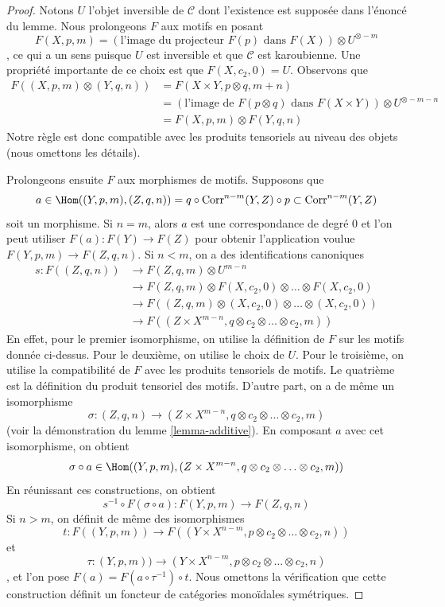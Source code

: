 \begin{proof}
Notons $U$ l'objet inversible de $\mathcal{C}$ dont l'existence
est supposée dans l'énoncé du lemme. Nous prolongeons $F$ aux motifs en posant
$$
F(X, p, m) = \left(\text{l'image du
projecteur }F(p)\text{ dans }F(X)\right) \otimes U^{\otimes -m}
$$,
ce qui a un sens puisque $U$ est inversible et que $\mathcal{C}$
est karoubienne. Une propriété importante de ce choix est que
$F(X, c_2, 0) = U$. Observons que
\begin{align*}
F((X, p, m) \otimes (Y, q, n))
& =
F(X \times Y, p \otimes q, m + n) \\
& =
\left(\text{l'image de }F(p \otimes q)\text{ dans }F(X \times Y)\right)
\otimes U^{\otimes -m - n} \\
& =
F(X, p, m) \otimes F(Y, q, n)
\end{align*}
Notre règle est donc compatible avec les produits tensoriels
au niveau des objets (nous omettons les détails).

\medskip\noindent
Prolongeons ensuite $F$ aux morphismes de motifs. Supposons que
$$
a \in
\Hom((Y, p, m), (Z, q, n)) =
q \circ \text{Corr}^{n - m}(Y, Z) \circ p \subset \text{Corr}^{n - m}(Y, Z)
$$
soit un morphisme. Si $n = m$, alors $a$ est une correspondance de degré $0$
et l'on peut utiliser $F(a) : F(Y) \to F(Z)$ pour obtenir l'application voulue
$F(Y, p, m) \to F(Z, q, n)$. Si $n < m$, on a des identifications canoniques
\begin{align*}
s : F((Z, q, n))
& \to
F(Z, q, m) \otimes U^{m - n} \\
& \to
F(Z, q, m) \otimes F(X, c_2, 0) \otimes \ldots \otimes F(X, c_2, 0) \\
& \to
F((Z, q, m) \otimes (X, c_2, 0) \otimes \ldots \otimes (X, c_2, 0)) \\
& \to
F((Z \times X^{m - n}, q \otimes c_2 \otimes \ldots \otimes c_2, m))
\end{align*}
En effet, pour le premier isomorphisme, on utilise la définition de $F$ sur les motifs
donnée ci-dessus. Pour le deuxième, on utilise le choix de $U$. Pour le troisième,
on utilise la compatibilité de $F$ avec les produits tensoriels de motifs.
Le quatrième est la définition du produit tensoriel des motifs. D'autre part,
on a de même un isomorphisme
$$
\sigma : (Z, q, n) \to
(Z \times X^{m - n}, q \otimes c_2 \otimes \ldots \otimes c_2, m)
$$
(voir la démonstration du lemme \ref{lemma-additive}). En composant $a$ avec cet isomorphisme,
on obtient
$$
\sigma \circ a \in
\Hom((Y, p, m),
(Z \times X^{m - n}, q \otimes c_2 \otimes \ldots \otimes c_2, m))
$$
En réunissant ces constructions, on obtient
$$
s^{-1} \circ F(\sigma \circ a) :
F(Y, p, m) \to
F(Z, q, n)
$$
Si $n > m$, on définit de même des isomorphismes
$$
t : F((Y, p, m)) \to
F((Y \times X^{n - m}, p \otimes c_2 \otimes \ldots \otimes c_2, n))
$$
et
$$
\tau : (Y, p, m)) \to
(Y \times X^{n - m}, p \otimes c_2 \otimes \ldots \otimes c_2, n)
$$,
et l'on pose $F(a) = F(a \circ \tau^{-1}) \circ t$.
Nous omettons la vérification que cette construction définit un foncteur
de catégories monoïdales symétriques.
\end{proof}


